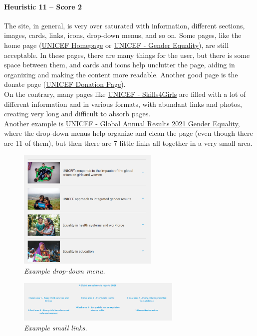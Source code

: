 \paragraph*{Heuristic 11 – Score 2}
The site, in general, is very over saturated with information, different sections, images, cards, links, icons, drop-down menus, and so on.
Some pages, like the home page (\href{https://www.unicef.org/}{UNICEF Homepage} or \href{https://www.unicef.org/gender-equality}{UNICEF - Gender Equality}), are still acceptable. In these pages, there are many things for the user, but there is some space between them, and cards and icons help unclutter the page, aiding in organizing and making the content more readable. Another good page is the donate page (\href{https://donazioni.unicef.it/}{UNICEF Donation Page}).\\
On the contrary, many pages like \href{https://www.unicef.org/gender-equality/skills4girls}{UNICEF - Skills4Girls} are filled with a lot of different information and in various formats, with abundant links and photos, creating very long and difficult to absorb pages.\\
Another example is \href{https://www.unicef.org/reports/global-annual-results-2021-gender-equality}{UNICEF - Global Annual Results 2021 Gender Equality}, where the drop-down menus help organize and clean the page (even though there are 11 of them), but then there are 7 little links all together in a very small area.
\begin{figure}[h]
	\centering
	\begin{center}
		\includegraphics[width=0.6\textwidth]{Picture15.png}
	\end{center}
	\captionsetup{font=small}
	\caption{\textit{Example drop-down menu.}}
	\label{fig:label15}
\end{figure}
\begin{figure}[h]
	\centering
	\begin{center}
		\includegraphics[width=0.7\textwidth]{Picture16.png}
	\end{center}
	\captionsetup{font=small}
	\caption{\textit{Example small links.}}
	\label{fig:label16}
\end{figure}

